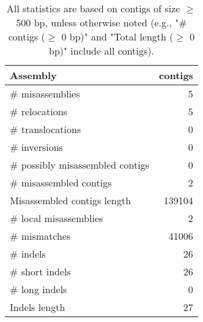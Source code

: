 \documentclass[12pt,a4paper]{article}
\begin{document}
\begin{table}[ht]
\begin{center}
\caption{All statistics are based on contigs of size $\geq$ 500 bp, unless otherwise noted (e.g., "\# contigs ($\geq$ 0 bp)" and "Total length ($\geq$ 0 bp)" include all contigs).}
\begin{tabular}{|l*{1}{|r}|}
\hline
Assembly & contigs \\ \hline
\# misassemblies & 5 \\ \hline
\hspace{5mm}\# relocations & 5 \\ \hline
\hspace{5mm}\# translocations & 0 \\ \hline
\hspace{5mm}\# inversions & 0 \\ \hline
\# possibly misassembled contigs & 0 \\ \hline
\# misassembled contigs & 2 \\ \hline
Misassembled contigs length & 139104 \\ \hline
\# local misassemblies & 2 \\ \hline
\# mismatches & 41006 \\ \hline
\# indels & 26 \\ \hline
\hspace{5mm}\# short indels & 26 \\ \hline
\hspace{5mm}\# long indels & 0 \\ \hline
Indels length & 27 \\ \hline
\end{tabular}
\end{center}
\end{table}
\end{document}
